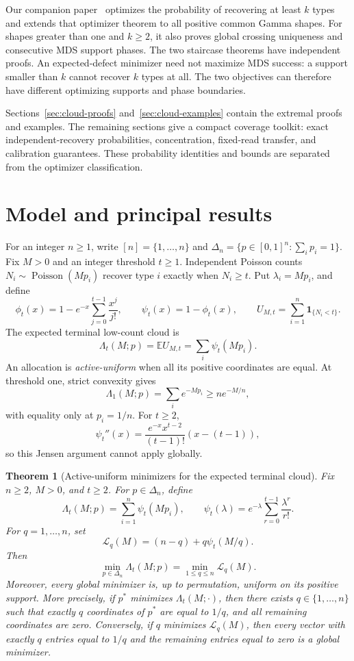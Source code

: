 \documentclass[11pt]{article}
\newtheorem{theorem}{Theorem}[section]
\theoremstyle{definition}
\theoremstyle{remark}
\DeclareMathOperator{\Poisson}{Poisson}
\newcommand{\E}{\mathbb E}
\newcommand{\1}{\mathbf 1}
\begin{document}
Our companion paper~\cite{LongGamma2026} optimizes the probability of
recovering at least \(k\) types and extends that optimizer theorem to
all positive common Gamma shapes. For shapes greater than one and
\(k\ge2\), it also proves global crossing uniqueness and consecutive
MDS support phases. The two staircase theorems have independent proofs.
An expected-defect minimizer need not maximize MDS success: a support
smaller than \(k\) cannot recover \(k\) types at all. The two objectives
can therefore have different optimizing supports and phase boundaries.

Sections~\ref{sec:cloud-proofs} and~\ref{sec:cloud-examples} contain
the extremal proofs and examples. The remaining sections give a compact
coverage toolkit: exact independent-recovery probabilities,
concentration, fixed-read transfer, and calibration guarantees.
These probability identities and bounds are separated from the
optimizer classification.

\section{Model and principal results}
For an integer \(n\ge1\), write \([n]=\{1,\ldots,n\}\) and
\(\Delta_n=\{p\in[0,1]^n:\sum_i p_i=1\}\). Fix \(M>0\) and
an integer threshold \(t\ge1\). Independent Poisson counts
\(N_i\sim\Poisson(Mp_i)\) recover type \(i\) exactly when
\(N_i\ge t\). Put \(\lambda_i=Mp_i\), and define
\[
 \phi_t(x)=1-e^{-x}\sum_{j=0}^{t-1}\frac{x^j}{j!},\qquad
 \psi_t(x)=1-\phi_t(x),\qquad
 U_{M,t}=\sum_{i=1}^n\1_{\{N_i<t\}}.
\]
The expected terminal low-count cloud is
\[
 \Lambda_t(M;p)=\E U_{M,t}=\sum_i\psi_t(Mp_i).
\]
An allocation is \emph{active-uniform} when all its positive coordinates
are equal. At threshold one, strict convexity gives
\[
 \Lambda_1(M;p)=\sum_i e^{-Mp_i}\ge ne^{-M/n},
\]
with equality only at \(p_i=1/n\). For \(t\ge2\),
\[
 \psi_t''(x)=\frac{e^{-x}x^{t-2}}{(t-1)!}(x-(t-1)),
\]
so this Jensen argument cannot apply globally.
\begin{theorem}[Active-uniform minimizers for the expected terminal cloud]\label{thm:active-uniform-terminal-cloud}
Fix \(n\ge2\), \(M>0\), and \(t\ge2\).  For \(p\in\Delta_n\), define
\[
  \Lambda_t(M;p)=\sum_{i=1}^n \psi_t(Mp_i),
  \qquad
  \psi_t(\lambda)=e^{-\lambda}\sum_{r=0}^{t-1}\frac{\lambda^r}{r!}.
\]
For \(q=1,\ldots,n\), set
\[
  \mathcal L_q(M)=(n-q)+q\psi_t(M/q).
\]
Then
\[
  \boxed{\min_{p\in\Delta_n}\Lambda_t(M;p)=\min_{1\le q\le n}\mathcal L_q(M).}
\]
Moreover, every global minimizer is, up to permutation, uniform on its positive support.  More precisely, if \(p^*\) minimizes \(\Lambda_t(M;\cdot)\), then there exists \(q\in\{1,\ldots,n\}\) such that exactly \(q\) coordinates of \(p^*\) are equal to \(1/q\), and all remaining coordinates are zero.  Conversely, if \(q\) minimizes \(\mathcal L_q(M)\), then every vector with exactly \(q\) entries equal to \(1/q\) and the remaining entries equal to zero is a global minimizer.
\end{theorem}
\end{document}

